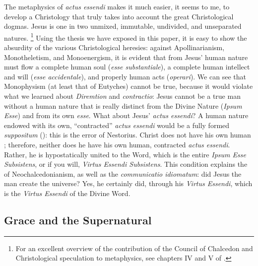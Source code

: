 The metaphysics of \emph{actus essendi} makes it much easier, it seems to me, to develop a Christology that truly takes into account the great Christological dogmas. Jesus is one  in two unmixed, immutable, undivided, and unseparated natures.%
%
\footnote{For an excellent overview of the contribution of the Council of Chalcedon and Christological speculation to metaphysics, see chapters IV and V of \cite[49--62]{lucas:absoluto}.}
%
Using the thesis we have exposed in this paper, it is easy to show the absurdity of the various Christological heresies: against Apollinarianism, Monotheletism, and Monoenergism, it is evident that from Jesus' human nature must flow a complete human soul (\emph{esse substantiale}), a complete human intellect and will (\emph{esse accidentale}), and properly human acts (\emph{operari}). We can see that Monophysism (at least that of Eutyches) cannot be true, because it would violate what we learned about \emph{Diremtion} and \emph{contractio}: Jesus cannot be a true man without a human nature that is really distinct from the Divine Nature (\emph{Ipsum Esse}) and from its own \emph{esse}. What about Jesus' \emph{actus essendi}? A human nature endowed with its own, ``contracted'' \emph{actus essendi} would be a fully formed \emph{suppositum} (): this is the error of Nestorius. Christ does not have his own human ; therefore, neither does he have his own human, contracted \emph{actus essendi}. Rather, he is hypostatically united to the Word, which is the entire \emph{Ipsum Esse Subsistens}, or if you will, \emph{Virtus Essendi Subsistens}. This condition explains the  of Neochalcedonianism, as well as the \emph{communicatio idiomatum}: did Jesus the man create the universe? Yes, he certainly did, through his \emph{Virtus Essendi}, which is the \emph{Virtus Essendi} of the Divine Word.

\subsection{Grace and the Supernatural}
\label{sec:grace}

